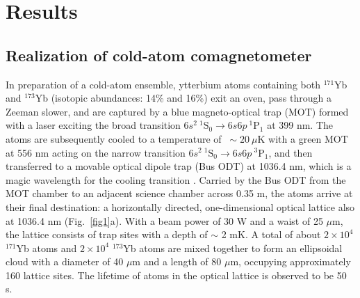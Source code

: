\documentclass[pdflatex,sn-nature,centre]{sn-jnl}%
\begin{document}
\section*{Results}
\subsection*{Realization of cold-atom comagnetometer}

In preparation of a cold-atom ensemble, ytterbium atoms containing both $^{171}$Yb and $^{173}$Yb (isotopic abundances: 14\% and 16\%) exit an oven, pass through a Zeeman slower, and are captured by a blue magneto-optical trap (MOT) formed with a laser exciting the broad transition ${6s^2}\ {^{1}\mathrm{S}_0}\rightarrow{6s6p\ ^{1}\mathrm{P}_1}$ at 399 nm. The atoms are subsequently cooled to a temperature of $~\sim20\ \mu$K with a green MOT at 556 nm acting on the narrow transition ${6s^2}\ {^{1}\mathrm{S}_0}\rightarrow{6s6p\ ^{3}\mathrm{P}_1}$, and then transferred to a movable optical dipole trap (Bus ODT) at 1036.4 nm, which is a magic wavelength for the cooling transition \cite{Zheng2020Magic}. Carried by the Bus ODT from the MOT chamber to an adjacent science chamber across 0.35 m, the atoms arrive at their final destination: a horizontally directed, one-dimensional optical lattice also at 1036.4 nm (Fig.~\ref{fig1}a). With a beam power of 30 W and a waist of 25 $\mu$m, the lattice consists of trap sites with a depth of $\sim$ 2 mK. A total of about $2\times10^4$ $^{171}$Yb atoms and $2\times10^4$ $^{173}$Yb atoms are mixed together to form an ellipsoidal cloud with a diameter of 40 $\mu$m and a length of 80 $\mu$m, occupying approximately 160 lattice sites. The lifetime of atoms in the optical lattice is observed to be 50 s.
\end{document}
